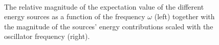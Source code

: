\begin{frame}
 \captionsetup[subfloat]{labelformat=empty}
\begin{figure}[h]
 \begin{center}
   \\
  \caption{The relative magnitude of the expectation value of the different energy sources as a function of the frequency $\omega$ (left) together with the magnitude of the sources' energy contributions scaled with the oscillator frequency (right).}
  \label{fig:E_dist_qdots}
 \end{center}
\end{figure}
\end{frame}

